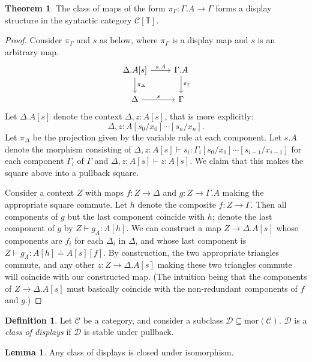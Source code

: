 \documentclass{article}
\theoremstyle{definition}
\newtheorem{definition}{Definition}[section]
\theoremstyle{theorem}
\newtheorem{theorem}{Theorem}[section]
\newtheorem{lemma}{Lemma}[section]
\newcommand{\T}{\mathbb T}
\newcommand{\C}{\mathcal C}
\newcommand{\D}{\mathcal D}
\newcommand{\syncat}[1]{\C [#1]}
\newcommand{\seq}{\doteq}
\newcommand{\mor}{\mathrm {mor}}
\begin{document}
\begin{theorem}\label{thm:syn-display}
    The class of maps of the form $\pi_\Gamma : \Gamma.A \to \Gamma$ forms a display structure in the syntactic category $\syncat{\T}$.
\end{theorem}
\begin{proof}
    Consider $\pi_\Gamma$ and $s$ as below, where $\pi_\Gamma$ is a display map and $s$ is an arbitrary map.
    \[
         \begin{tikzcd}
             \Delta.A[s] \ar[r,"s.A"] \ar[d,"\pi_\Delta"] & \Gamma.A \ar[d,"\pi_\Gamma"]
             \\ 
             \Delta \ar[r,"s"] & \Gamma
         \end{tikzcd}
    \]
    Let $\Delta.A[s]$ denote the context $\Delta, z: A[s]$, that is more explicitly: 
    \[\Delta, z: A[s_0/x_0]\cdots[s_n/x_n].\]
    Let $\pi_\Delta$ be the projection given by the variable rule at each component.
    Let $s.A$ denote the morphism consisting of $\Delta, z: A[s] \vdash s_i : \Gamma_i[s_0/x_0]\cdots[s_{i-1}/x_{i-1}]$ for each component $\Gamma_i$ of $\Gamma$ and $\Delta, z: A[s] \vdash z : A [s]$.
    We claim that this makes the square above into a pullback square.

    Consider a context $Z$ with maps $f: Z \to \Delta$ and $g: Z \to \Gamma.A$ making the appropriate square commute. Let $h$ denote the composite $f: Z \to \Gamma$. Then all components of $g$ but the last component coincide with $h$; denote the last component of $g$ by $Z \vdash g_A : A[h]$. We can construct a map $Z \to \Delta.A[s]$ whose components are $f_i$ for each $\Delta_i$ in $\Delta$, and whose last component is $Z \vdash g_A : A[h] \seq A[s][f]$. By construction, the two appropriate triangles commute, and any other $z: Z \to \Delta.A[s]$ making these two triangles commute will coincide with our constructed map. (The intuition being that the components of $Z \to \Delta.A[s]$ must basically coincide with the non-redundant components of $f$ and $g$.)
\end{proof}

\begin{definition}
    Let $\C$ be a category, and consider a subclass $\D \subseteq \mor (\C)$. $\D$ is a \emph{class of displays} if $\D$ is stable under pullback.
\end{definition}

\begin{lemma}
    Any class of displays is closed under isomorphism.
\end{lemma}
\end{document}
